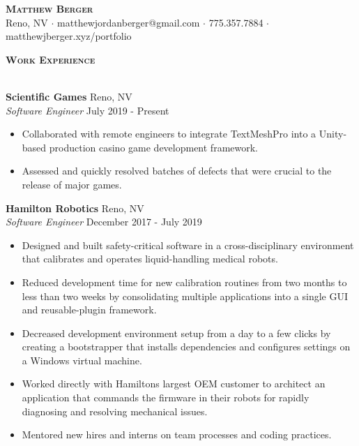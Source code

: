 \documentclass[a4paper]{article}
\newcommand{\lineunder} {
    \vspace*{-8pt} \\
    \hspace*{-18pt} \hrulefill \\
}
\newcommand{\header} [1] {
    {\hspace*{-18pt}\vspace*{6pt} \large \textbf{\textsc{#1}}}
    \vspace*{-6pt} \lineunder
    \vspace*{4pt}
}
\begin{document}
\vspace*{-40pt}

    

\begin{center}
    {\Huge \scshape \textbf{Matthew Berger}}\\
    \vspace*{4pt}
    Reno, NV $\cdot$ matthewjordanberger@gmail.com $\cdot$ 775.357.7884 $\cdot$ matthewjberger.xyz/portfolio\\
    \vspace*{-4pt}
\end{center}

\header{Work Experience}

\textbf{Scientific Games} \hfill Reno, NV\\
\textit{Software Engineer} \hfill July 2019 - Present\\
\vspace{-1mm}
\begin{itemize} \itemsep 1pt
	\item Collaborated with remote engineers to integrate TextMeshPro into a Unity-based production casino game development framework.
	\item Assessed and quickly resolved batches of defects that were crucial to the release of major games.
\end{itemize}
\textbf{Hamilton Robotics} \hfill Reno, NV\\
\textit{Software Engineer} \hfill December 2017 - July 2019\\
\vspace{-1mm}
\begin{itemize} \itemsep 1pt
	\item Designed and built safety-critical software in a cross-disciplinary environment that calibrates and operates liquid-handling medical robots.
	\item Reduced development time for new calibration routines from two months to less than two weeks by consolidating multiple applications into a single GUI and reusable-plugin framework.
	\item Decreased development environment setup from a day to a few clicks by creating a bootstrapper that installs dependencies and configures settings on a Windows virtual machine.
	\item Worked directly with Hamilton\textquotesingle{}s largest OEM customer to architect an application that commands the firmware in their robots for rapidly diagnosing and resolving mechanical issues.
	\item Mentored new hires and interns on team processes and coding practices.
\end{itemize}
\end{document}
